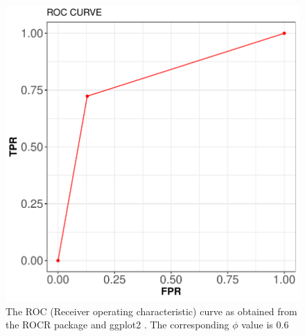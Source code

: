 \documentclass[12pt,%
               a4paper,%
               oneside,openany,%
               titlepage,%
               headinclude,footinclude,%
               BCOR5mm,%
               cleardoublepage=empty,%
               tablecaptionabove,%
               floatperchapter,
               ]{scrreprt}                 %
\begin{document}
\begin{figure}[h]
\begin{center}
\includegraphics[width=1\textwidth]{Figures/ROC_mgm.pdf}
\caption{The ROC (Receiver operating characteristic) curve as obtained from the ROCR package \cite{sing2005rocr} and ggplot2 \cite{ggplot2}. The corresponding $\phi$ value is $0.6$ } 
\label{ROC_mgm}
\end{center}
\end{figure}
\end{document}
